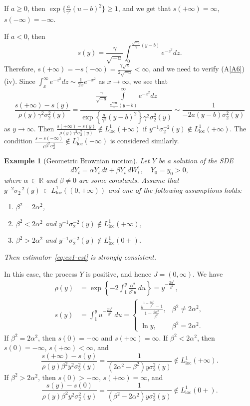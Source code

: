 \documentclass[numbers,compress,v1.0.1]{vmsta}
\newtheorem{example}{Example}
\theoremstyle{remark}
\newcommand{\R}{\mathbb R}
\newcommand*{\set}[1]{\left\{#1\right\}}
\newcommand{\lloc}{L^1_{\mathrm{loc}}}
\begin{document}
If $a\ge0$, then
$\exp\{\frac{a}{\gamma^2}(u-b)^2\}\ge1$, and we get that
$s(+\infty)=\infty$, $s(-\infty)=-\infty$.

If $a<0$, then
%
\[
s(y)=\frac{\gamma}{\sqrt{-a}}\int_0^{\frac{\sqrt{-a}}{\gamma}(y-b)}
e^{-z^2}dz.
\]
%
Therefore,
$s(+\infty)=-s(-\infty)=\frac{\gamma\sqrt{\pi}}{2\sqrt{-a}}<\infty$,
and we need to verify (A\ref{A6})(iv).
Since $\int_x^\infty e^{-z^2}dz\sim\frac{1}{2x}e^{-x^2}$ as $x\to\infty
$, we see that
%
\[
\frac{s(+\infty)-s(y)}{\rho(y)\gamma^2\sigma_2^2(y)} =\frac{\frac{\gamma}{\sqrt{-a}}\int\limits_{\frac{\sqrt{-a}}{\gamma
}(y-b)}^\infty e^{-z^2}dz}{\exp\set{\frac{a}{\gamma^2}(y-b)^2}\gamma
^2\sigma_2^2(y)} \sim\frac{1}{-2a(y-b)\sigma_2^2(y)}
\]
%
as $y\to\infty$. Then $\frac{s(+\infty)-s(y)}{\rho(y)\gamma^2\sigma
_2^2(y)}\notin\lloc(+\infty)$
if $y^{-1}\sigma_2^{-2}(y)\notin\lloc(+\infty)$.
The condition
$\frac{s-s(-\infty)}{\rho\beta^2\sigma_2^2}\notin\lloc(-\infty)$
is considered similarly.\vadjust{\eject}

\begin{example}[Geometric Brownian motion]
Let $Y$ be a solution of the SDE
%
\[
dY_t =\alpha Y_t\,dt + \beta Y_t
\,dW_t^1, \quad Y_0=y_0>0,
\]
%
where $\alpha\,{\in}\,\R$ and $\beta\ne0$ are some constants.
Assume that $y^{-2}\sigma_2^{-2}(y)\,{\in}\,\lloc((0,+\infty))$ and one of
the following assumptions holds:
%
\begin{enumerate}[\rm(i)]
%
\item$\beta^2=2\alpha^2$,
%
\item$\beta^2<2\alpha^2$ and $y^{-1}\sigma_2^{-2}(y)\notin\lloc(+\infty)$,
%
\item$\beta^2>2\alpha^2$ and $y^{-1}\sigma_2^{-2}(y)\notin\lloc(0+)$.
\end{enumerate}
%
Then estimator~\eqref{eq:ex1-est} is strongly consistent.
\end{example}
%
In this case, the process $Y$ is positive, and hence $J=(0,\infty)$.
We have
%
\begin{align*}
\rho(y)&=\exp\set{-2\int_1^y\frac{\alpha^2}{\beta^2u}
\,du} =y^{-\frac{2\alpha^2}{\beta^2}},
\\
s(y)&=\int_1^yu^{-\frac{2\alpha^2}{\beta^2}}\,du=
%
\begin{cases}
\frac{y^{1-\frac{2\alpha^2}{\beta^2}}-1}{1-\frac{2\alpha^2}{\beta^2}},
& \beta^2\ne2\alpha^2,\\
\ln y,
& \beta^2=2\alpha^2.
\end{cases} %
\end{align*}
%
If $\beta^2=2\alpha^2$, then
$s(0)=-\infty$ and $s(+\infty)=\infty$.
If $\beta^2<2\alpha^2$, then
$s(0)=-\infty$,
$s(+\infty)<\infty$, and
%
\[
\frac{s(+\infty)-s(y)}{\rho(y)\beta^2y^2\sigma_2^2(y)} =\frac{1}{(2\alpha^2-\beta^2)y\sigma_2^2(y)} \notin\lloc(+\infty).
\]
%
If $\beta^2>2\alpha^2$, then
$s(0)>-\infty$,
$s(+\infty)=\infty$, and
%
\[
\frac{s(y)-s(0)}{\rho(y)\beta^2y^2\sigma_2^2(y)} =\frac{1}{(\beta^2-2\alpha^2)y\sigma_2^2(y)} \notin\lloc(0+).
\]
\end{document}
